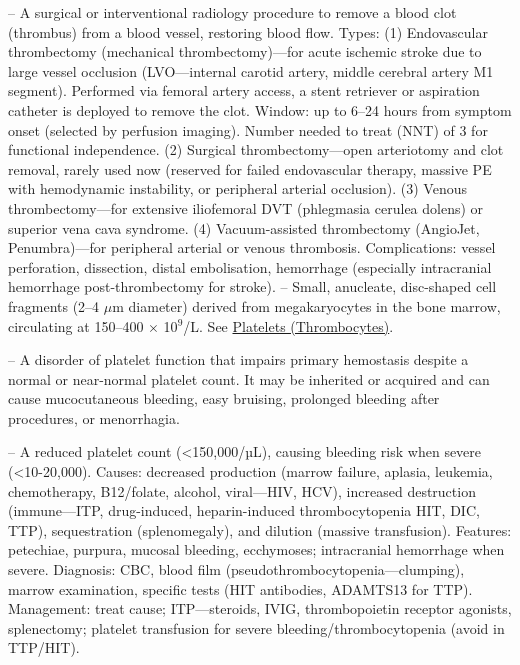 -- A surgical or interventional radiology procedure to remove a blood clot (thrombus) from a blood vessel, restoring blood flow. Types: (1) Endovascular thrombectomy (mechanical thrombectomy)—for acute ischemic stroke due to large vessel occlusion (LVO—internal carotid artery, middle cerebral artery M1 segment). Performed via femoral artery access, a stent retriever or aspiration catheter is deployed to remove the clot. Window: up to 6--24 hours from symptom onset (selected by perfusion imaging). Number needed to treat (NNT) of 3 for functional independence. (2) Surgical thrombectomy—open arteriotomy and clot removal, rarely used now (reserved for failed endovascular therapy, massive PE with hemodynamic instability, or peripheral arterial occlusion). (3) Venous thrombectomy—for extensive iliofemoral DVT (phlegmasia cerulea dolens) or superior vena cava syndrome. (4) Vacuum-assisted thrombectomy (AngioJet, Penumbra)—for peripheral arterial or venous thrombosis. Complications: vessel perforation, dissection, distal embolisation, hemorrhage (especially intracranial hemorrhage post-thrombectomy for stroke).
-- Small, anucleate, disc-shaped cell fragments (2--4 \(\mu\)m diameter) derived from megakaryocytes in the bone marrow, circulating at 150--400 \(\times\) 10\(^9\)/L. See \hyperlink{Platelets (Thrombocytes)}{Platelets (Thrombocytes)}.

-- A disorder of platelet function that impairs primary hemostasis despite a normal or near-normal platelet count. It may be inherited or acquired and can cause mucocutaneous bleeding, easy bruising, prolonged bleeding after procedures, or menorrhagia.

-- A reduced platelet count (<150,000/µL), causing bleeding risk when severe (<10-20,000). Causes: decreased production (marrow failure, aplasia, leukemia, chemotherapy, B12/folate, alcohol, viral—HIV, HCV), increased destruction (immune—ITP, drug-induced, heparin-induced thrombocytopenia HIT, DIC, TTP), sequestration (splenomegaly), and dilution (massive transfusion). Features: petechiae, purpura, mucosal bleeding, ecchymoses; intracranial hemorrhage when severe. Diagnosis: CBC, blood film (pseudothrombocytopenia—clumping), marrow examination, specific tests (HIT antibodies, ADAMTS13 for TTP). Management: treat cause; ITP—steroids, IVIG, thrombopoietin receptor agonists, splenectomy; platelet transfusion for severe bleeding/thrombocytopenia (avoid in TTP/HIT).

